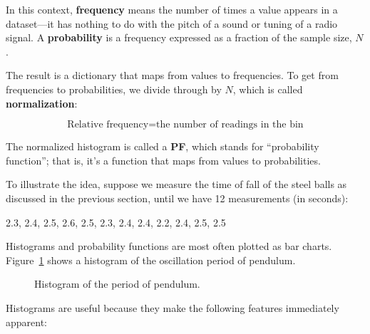 

In this context, {\bf frequency} means the number of times a value
appears in a dataset---it has nothing to do with the pitch of a sound
or tuning of a radio signal.  A {\bf probability} is a frequency expressed
as a fraction of the sample size, $N$.


The result is a dictionary that maps from values to frequencies.
To get from frequencies to probabilities, we divide through by $N$,
which is called {\bf normalization}:

\begin{equation}
\text{Relative frequency} = \text{the number of readings in the bin}
\end{equation}

The normalized histogram is called a {\bf PF}, which stands for
``probability function''; that is, it's a function that maps from
values to probabilities.

To illustrate the idea, suppose we measure the time of fall of the steel balls  as discussed in the previous section, until we have 12 measurements (in seconds):

2.3, 2.4, 2.5, 2.6, 2.5, 2.3, 2.4, 2.4, 2.2, 2.4, 2.5, 2.5

Histograms and probability functions are most often plotted as bar charts.  Figure~\ref{pendulum} shows a histogram of the oscillation period of pendulum. 

\begin{figure}[h]
\begin{center}
\end{center}
\caption{ \quad Histogram of the period of pendulum.}
\label{pendulum}
\end{figure}

Histograms are useful because they make the following features immediately
apparent:

